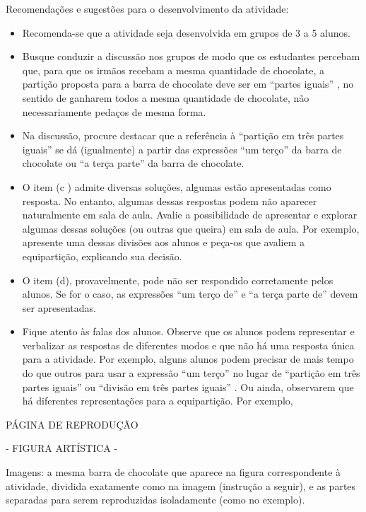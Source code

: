 \documentclass[a4paper,12pt,twoside]{book}
\begin{document}
\begin{professor*}[breakable]{}{}
  
  Recomendações e sugestões para o desenvolvimento da atividade:  
\begin{itemize} %
    \item       Recomenda-se que a atividade seja desenvolvida em grupos de 3 a 5 alunos. 
    \item       Busque conduzir a discussão nos grupos de modo que os estudantes percebam que, para que os irmãos recebam a mesma quantidade de chocolate, a partição proposta para a barra de chocolate deve ser em       ``partes iguais''      , no sentido de ganharem todos a mesma quantidade de chocolate, não necessariamente pedaços de mesma forma.
    \item       Na discussão, procure destacar que a referência à       ``partição em três partes iguais''       se dá (igualmente) a partir das expressões       ``um terço''       da barra de chocolate ou       ``a terça parte''       da barra de chocolate.
    \item       O item (c ) admite diversas soluções, algumas estão apresentadas como resposta. No entanto, algumas dessas respostas podem não aparecer naturalmente em sala de aula. Avalie a possibilidade de apresentar e explorar algumas dessas soluções (ou outras que queira) em sala de aula. Por exemplo, apresente uma dessas divisões aos alunos e peça-os que avaliem a equipartição, explicando sua decisão.
    \item       O item (d), provavelmente, pode não ser respondido corretamente pelos alunos. Se for o caso, as expressões       ``um terço de''       e       ``a terça parte de''       devem ser apresentadas. 
    \item       Fique atento às falas dos alunos. Observe que os alunos podem representar e verbalizar as respostas de diferentes modos e que não há uma resposta única para a atividade. Por exemplo, alguns alunos podem precisar de mais tempo do que outros para usar a expressão       ``um terço''       no lugar de       ``partição em três partes iguais''       ou       ``divisão em três partes iguais''      . Ou ainda, observarem que há diferentes representações para a equipartição. Por exemplo, 
\end{itemize} %
  
  
  \begin{imagem*}[breakable]{}{}    
    PÁGINA DE REPRODUÇÃO    
    
    - FIGURA ARTÍSTICA -    
    
    Imagens: a mesma barra de chocolate que aparece na figura correspondente à atividade, dividida exatamente como na imagem (instrução a seguir), e as partes separadas para serem reproduzidas isoladamente (como no exemplo).    
    

\end{imagem*}
\end{professor*}
\end{document}

